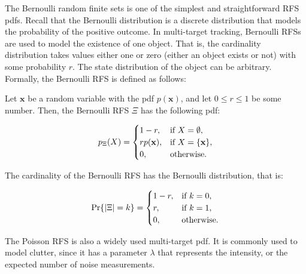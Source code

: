 The Bernoulli random finite sets is one of the simplest and straightforward RFS pdfs. Recall that the Bernoulli distribution is a discrete distribution that models the probability of the positive outcome. In multi-target tracking, Bernoulli RFSs are used to model the existence of one object. That is, the cardinality distribution takes values either one or zero (either an object exists or not) with some probability $r$. The state distribution of the object can be arbitrary. Formally, the Bernoulli RFS is defined as follows:

\begin{definition}
    Let $\mathbf{x}$ be a random variable with the pdf $p(\mathbf{x})$, and let $0 \leq r \leq 1$ be some number. Then, the Bernoulli RFS $\Xi$ has the following pdf:

    \begin{equation}
        p_\Xi(X) =
        \begin{cases}
            1 - r, & \textup{if } X = \emptyset, \\
            r p(\mathbf{x}), & \textup{if } X = \{\mathbf{x}\}, \\
            0, & \textup{otherwise}.
        \end{cases}
    \end{equation}

    The cardinality of the Bernoulli RFS has the Bernoulli distribution, that is:

    \begin{equation}
        \Pr{|\Xi| = k} = \begin{cases}
            1 - r, & \textup{if } k = 0, \\
            r, & \textup{if } k = 1, \\
            0, & \textup{otherwise}.
        \end{cases}
    \end{equation}
\end{definition}

The Poisson RFS is also a widely used multi-target pdf. It is commonly used to model clutter, since it has a parameter $\lambda$ that represents the intensity, or the expected number of noise measurements.

